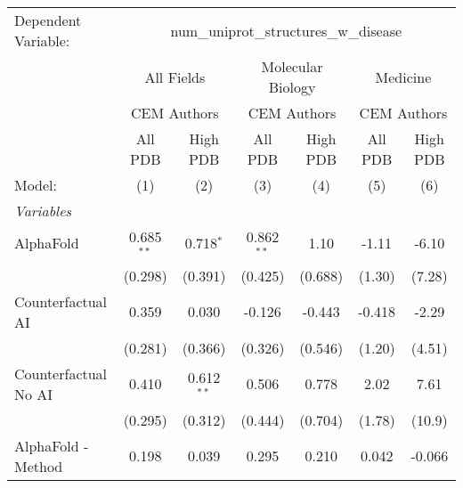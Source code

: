 \begingroup
\centering
\begin{tabular}{lcccccc}
   \tabularnewline \midrule \midrule
   Dependent Variable: & \multicolumn{6}{c}{num\_uniprot\_structures\_w\_disease}\\
 & \multicolumn{2}{c}{All Fields} & \multicolumn{2}{c}{Molecular Biology} & \multicolumn{2}{c}{Medicine} \\
\cmidrule(lr){2-3} \cmidrule(lr){4-5} \cmidrule(lr){6-7}
 & \multicolumn{2}{c}{CEM Authors} & \multicolumn{2}{c}{CEM Authors} & \multicolumn{2}{c}{CEM Authors} \\
\cmidrule(lr){2-3} \cmidrule(lr){4-5} \cmidrule(lr){6-7}
 & \multicolumn{1}{c}{All PDB} & \multicolumn{1}{c}{High PDB} & \multicolumn{1}{c}{All PDB} & \multicolumn{1}{c}{High PDB} & \multicolumn{1}{c}{All PDB} & \multicolumn{1}{c}{High PDB} \\
\cmidrule(lr){2-2} \cmidrule(lr){3-3} \cmidrule(lr){4-4} \cmidrule(lr){5-5} \cmidrule(lr){6-6} \cmidrule(lr){7-7}
   Model:                                                     & (1)          & (2)           & (3)           & (4)          & (5)           & (6)\\  
   \midrule
   \emph{Variables}\\
   AlphaFold                                                  & 0.685$^{**}$ & 0.718$^{*}$   & 0.862$^{**}$  & 1.10         & -1.11         & -6.10\\   
                                                              & (0.298)      & (0.391)       & (0.425)       & (0.688)      & (1.30)        & (7.28)\\   
   Counterfactual AI                                          & 0.359        & 0.030         & -0.126        & -0.443       & -0.418        & -2.29\\   
                                                              & (0.281)      & (0.366)       & (0.326)       & (0.546)      & (1.20)        & (4.51)\\   
   Counterfactual No AI                                       & 0.410        & 0.612$^{**}$  & 0.506         & 0.778        & 2.02          & 7.61\\   
                                                              & (0.295)      & (0.312)       & (0.444)       & (0.704)      & (1.78)        & (10.9)\\   
   AlphaFold - Method                                         & 0.198        & 0.039         & 0.295         & 0.210        & 0.042         & -0.066\\   

\end{tabular}

